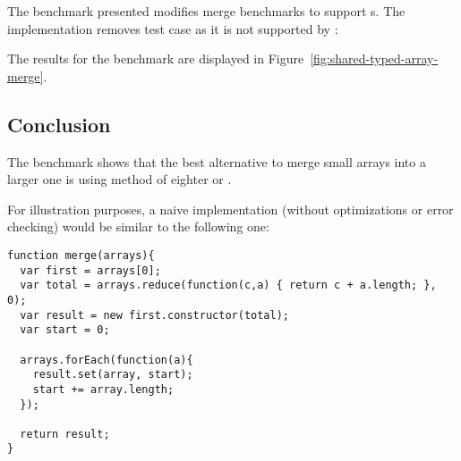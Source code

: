 The benchmark presented modifies \ttarray{} merge benchmarks to support \tstarray{}s. The implementation removes \dataview{} test case as it is not supported by \tstarray{}:

The results for the benchmark are displayed in Figure~\ref{fig:shared-typed-array-merge}.

\subsection{Conclusion}
The benchmark shows that the best alternative to merge small arrays into a larger one is using  method of eighter \ttarray or \tstarray.

For illustration purposes, a naive implementation (without optimizations or error checking) would be similar to the following one:
\begin{lstlisting}[caption=Simple \ttarray{} merge function]
function merge(arrays){
  var first = arrays[0];
  var total = arrays.reduce(function(c,a) { return c + a.length; }, 0);
  var result = new first.constructor(total);
  var start = 0;

  arrays.forEach(function(a){
    result.set(array, start);
    start += array.length;
  });

  return result;
}
\end{lstlisting}

\pagebreak